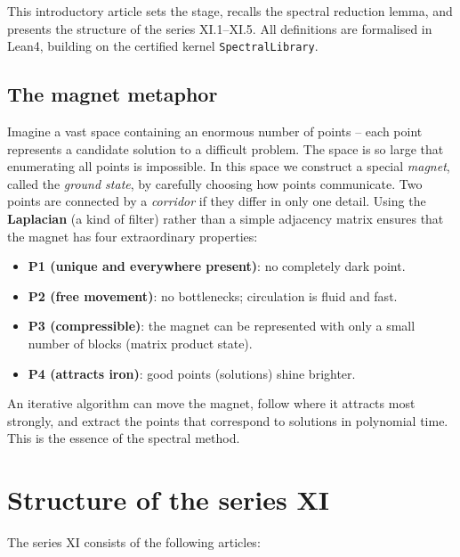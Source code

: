 \documentclass[11pt,a4paper]{article}
\begin{document}
This introductory article sets the stage, recalls the spectral reduction lemma, and presents the structure of the series XI.1–XI.5. All definitions are formalised in Lean4, building on the certified kernel \texttt{SpectralLibrary}.

\subsection{The magnet metaphor}

Imagine a vast space containing an enormous number of points – each point represents a candidate solution to a difficult problem. The space is so large that enumerating all points is impossible. In this space we construct a special \emph{magnet}, called the \emph{ground state}, by carefully choosing how points communicate. Two points are connected by a \emph{corridor} if they differ in only one detail. Using the \textbf{Laplacian} (a kind of filter) rather than a simple adjacency matrix ensures that the magnet has four extraordinary properties:

\begin{itemize}
\item \textbf{P1 (unique and everywhere present)}: no completely dark point.
\item \textbf{P2 (free movement)}: no bottlenecks; circulation is fluid and fast.
\item \textbf{P3 (compressible)}: the magnet can be represented with only a small number of blocks (matrix product state).
\item \textbf{P4 (attracts iron)}: good points (solutions) shine brighter.
\end{itemize}

An iterative algorithm can move the magnet, follow where it attracts most strongly, and extract the points that correspond to solutions in polynomial time. This is the essence of the spectral method.

\section{Structure of the series XI}

The series XI consists of the following articles:
\end{document}
